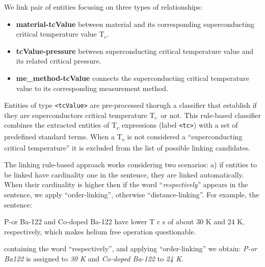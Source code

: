 \documentclass[]{interact}
\theoremstyle{plain}%
\theoremstyle{definition}
\theoremstyle{remark}
\newcommand{\tc}{T$_{c}$}
\begin{document}
We link pair of entities focusing on three types of relationships:
\begin{itemize}
    \item \textbf{material-tcValue} between material and its corresponding superconducting critical temperature value \tc.
    \item \textbf{tcValue-pressure} between superconducting critical temperature value and its related critical pressure.
    \item \textbf{me\_method-tcValue} connects the superconducting critical temperature value to its corresponding measurement method.
\end{itemize}

Entities of type \texttt{<tcValue>} are pre-processed thorugh a classifier that establish if they are superconductors critical temperature \tc~or not.
This rule-based classifier combines the extracted entities of T\textsubscript{c} expressions (label \texttt{<tc>}) with a set of predefined standard terms.
When a T\textsubscript{c} is not considered a ``superconducting critical temperature'' it is excluded from the list of possible linking candidates.

The linking rule-based approach works considering two scenarios: a) if entities to be linked have cardinality one in the sentence, they are linked automatically.
When their cardinality is higher then if the word ``\textit{respectively}'' appears in the sentence, we apply ``order-linking'', otherwise ``distance-linking''.
For example, the sentence:
\begin{displayquote}
    P-or Ba-122  and Co-doped Ba-122 have lower T c s of about 30 K and 24 K, respectively, which makes helium free operation questionable.
\end{displayquote}
containing the word ``respectively'', and applying ``order-linking'' we obtain: \textit{P-or Ba122} is assigned to \textit{30 K} and \textit{Co-doped Ba-122} to \textit{24 K}.
\end{document}
